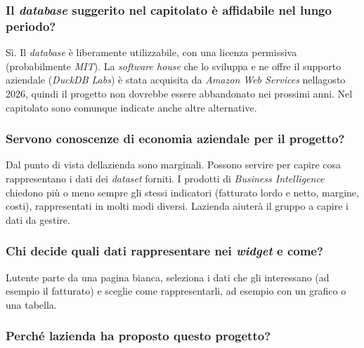 \documentclass[12pt,a4paper]{article}
\begin{document}
\hypertarget{il-database-suggerito-nel-capitolato-uxe8-affidabile-nel-lungo-periodo}{%
\subsubsection{\texorpdfstring{Il \emph{database} suggerito nel capitolato è affidabile nel lungo periodo?}{Il database suggerito nel capitolato è affidabile nel lungo periodo?}}}

Sì. Il \emph{database} è liberamente utilizzabile, con una licenza permissiva (probabilmente \emph{MIT}). La \emph{software house} che lo sviluppa e ne offre il supporto aziendale (\emph{DuckDB Labs}) è stata acquisita da \emph{Amazon Web Services} nell\textquotesingle agosto 2026, quindi il progetto non dovrebbe essere abbandonato nei prossimi anni. Nel capitolato sono comunque indicate anche altre alternative.

\hypertarget{servono-conoscenze-di-economia-aziendale-per-il-progetto}{%
\subsubsection{Servono conoscenze di economia aziendale per il progetto?}}

Dal punto di vista dell\textquotesingle azienda sono marginali. Possono servire per capire cosa rappresentano i dati dei \emph{dataset} forniti. I prodotti di \emph{Business Intelligence} chiedono più o meno sempre gli stessi indicatori (fatturato lordo e netto, margine, costi), rappresentati in molti modi diversi. L\textquotesingle azienda aiuterà il gruppo a capire i dati da gestire.

\hypertarget{chi-decide-quali-dati-rappresentare-nei-widget-e-come}{%
\subsubsection{\texorpdfstring{Chi decide quali dati rappresentare nei \emph{widget} e come?}{Chi decide quali dati rappresentare nei widget e come?}}}

L\textquotesingle utente parte da una pagina bianca, seleziona i dati che gli interessano (ad esempio il fatturato) e sceglie come rappresentarli, ad esempio con un grafico o una tabella.

\hypertarget{perchuxe9-lazienda-ha-proposto-questo-progetto}{%
\subsubsection{Perché l\textquotesingle azienda ha proposto questo progetto?}}
\end{document}
